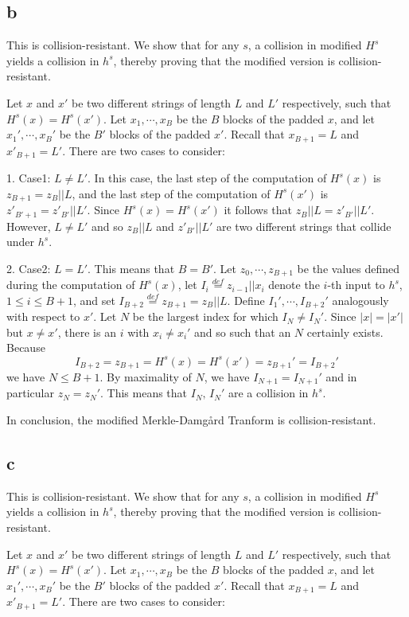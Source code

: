 \documentclass[a4papers]{ctexart}
\begin{document}
\subsection*{b}
This is collision-resistant.
We show that for any $s$, a collision in modified $H^s$ yields a collision in $h^s$, 
thereby proving that the modified version is collision-resistant.

Let $x$ and $x'$ be two different strings of length $L$ and $L'$ respectively, such that
$H^s(x)=H^s(x')$. Let $x_1,\cdots,x_B$ be the $B$ blocks of the padded $x$, and let $x_1',\cdots,x_B'$ 
be the $B'$ blocks of the padded $x'$. Recall that $x_{B+1}=L$ and $x'_{B+1}=L'$. 
There are two cases to consider:

1. Case1: $L\ne L'$. In this case, the last step of the computation of $H^s(x)$ is $z_{B+1}=z_{B}||L$, and
the last step of the computation of $H^s(x')$ is $z'_{B'+1}=z'_{B'}||L'$. Since $H^s(x)=H^s(x')$ it follows that 
$z_{B}||L = z'_{B'}||L'$. However, $L \ne L'$ and so $z_{B}||L$ and $z'_{B'}||L'$ are two different strings that collide under $h^s$.

2. Case2: $L=L'$. This means that $B=B'$. Let $z_0,\cdots,z_{B+1}$ be the values defined during
the computation of $H^s(x)$, let $I_i \overset{def}{=} z_{i-1}||x_i$ denote the $i$-th input to $h^s$, $1\le i\le B+1$,
 and set $I_{B+2}\overset{def}{=}z_{B+1}=z_B||L$. Define $I_1',\cdots,I_{B+2}'$ analogously with respect to $x'$.
 Let $N$ be the largest index for which $I_N\ne I_{N}'$. Since $|x|=|x'|$ but $x\ne x'$, there is an $i$ with $x_i\ne x_i'$
 and so such that an $N$ certainly exists. Because
 \[ I_{B+2}=z_{B+1}=H^s(x)=H^s(x')=z_{B+1}'=I_{B+2}' \]
 we have $N\le B+1$. By maximality of $N$, we have $I_{N+1}=I_{N+1}'$ and in particular $z_{N}=z_{N}'$. 
 This means that $I_N,\, I_N'$ are a collision in $h^s$.

 In conclusion, the modified Merkle-Damgård Tranform is collision-resistant.


\subsection*{c}
This is collision-resistant.
We show that for any $s$, a collision in modified $H^s$ yields a collision in $h^s$, 
thereby proving that the modified version is collision-resistant.

Let $x$ and $x'$ be two different strings of length $L$ and $L'$ respectively, such that
$H^s(x)=H^s(x')$. Let $x_1,\cdots,x_B$ be the $B$ blocks of the padded $x$, and let $x_1',\cdots,x_B'$ 
be the $B'$ blocks of the padded $x'$. Recall that $x_{B+1}=L$ and $x'_{B+1}=L'$. 
There are two cases to consider:
\end{document}
